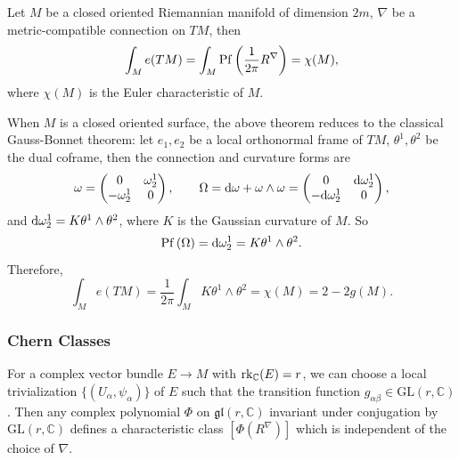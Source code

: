 \begin{theorem}
    Let $M$ be a closed oriented Riemannian manifold of dimension $2m$, 
    $\nabla$ be a metric-compatible connection on $TM$, then
    \begin{equation*}
        \int_M e(TM) = \int_M {\rm Pf}\left(\frac{1}{2\pi}R^\nabla\right) = \chi(M),
    \end{equation*}
    where $\chi(M)$ is the Euler characteristic of $M$.    
\end{theorem}
\begin{example}
    When $M$ is a closed oriented surface, the above theorem reduces to the classical Gauss-Bonnet theorem: 
    let $e_1,e_2$ be a local orthonormal frame of $TM$, $\theta^1,\theta^2$ be the dual coframe, 
    then the connection and curvature forms are
    \begin{equation*}
        \omega = 
        \begin{pmatrix}
            0 & \omega^1_2 \\
            -\omega^1_2 & 0
        \end{pmatrix}, \qquad
        \Omega = {\rm d}\omega + \omega\wedge\omega = 
        \begin{pmatrix}
            0 & {\rm d}\omega^1_2 \\
            -{\rm d}\omega^1_2 & 0
        \end{pmatrix},
    \end{equation*}
    and ${\rm d}\omega^1_2 = K\theta^1\wedge\theta^2$, where $K$ is the Gaussian curvature of $M$. 
    So
    \begin{equation*}
        {\rm Pf}\left(\Omega\right) = {\rm d}\omega^1_2 = K\theta^1\wedge\theta^2.
    \end{equation*}
    Therefore,
    \begin{equation*}
        \int_M e(TM) = \frac{1}{2\pi}\int_M K\theta^1\wedge\theta^2 = \chi(M) = 2 - 2g(M).
    \end{equation*}
\end{example}

\subsubsection{Chern Classes}
For a complex vector bundle $E\to M$ with ${\rm rk}_{\mathbb{C}}(E)=r$, 
we can choose a local trivialization $\{(U_\alpha,\psi_\alpha)\}$ of $E$ 
such that the transition function $g_{\alpha\beta}\in\mathrm{GL}(r,\mathbb{C})$. 
Then any complex polynomial $\Phi$ on $\mathfrak{gl}(r,\mathbb{C})$ 
invariant under conjugation by $\mathrm{GL}(r,\mathbb{C})$ 
defines a characteristic class $[\Phi(R^\nabla)]$ which is independent of the choice of $\nabla$. 

